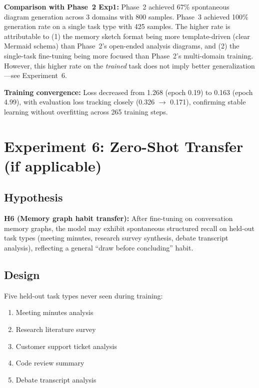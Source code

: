 \documentclass[11pt,a4paper]{article}
\begin{document}
\textbf{Comparison with Phase~2 Exp1:} Phase~2 achieved 67\% spontaneous diagram generation across 3 domains with 800 samples. Phase~3 achieved 100\% generation rate on a single task type with 425 samples. The higher rate is attributable to (1) the memory sketch format being more template-driven (clear Mermaid schema) than Phase~2's open-ended analysis diagrams, and (2) the single-task fine-tuning being more focused than Phase~2's multi-domain training. However, this higher rate on the \textit{trained} task does not imply better generalization---see Experiment~6.

\textbf{Training convergence:} Loss decreased from 1.268 (epoch 0.19) to 0.163 (epoch 4.99), with evaluation loss tracking closely (0.326 $\rightarrow$ 0.171), confirming stable learning without overfitting across 265 training steps.


\section{Experiment 6: Zero-Shot Transfer (if applicable)}

\subsection{Hypothesis}

\textbf{H6 (Memory graph habit transfer):} After fine-tuning on conversation memory graphs, the model may exhibit spontaneous structured recall on held-out task types (meeting minutes, research survey synthesis, debate transcript analysis), reflecting a general ``draw before concluding'' habit.

\subsection{Design}

Five held-out task types never seen during training:
\begin{enumerate}[nosep]
\item Meeting minutes analysis
\item Research literature survey
\item Customer support ticket analysis
\item Code review summary
\item Debate transcript analysis
\end{enumerate}
\end{document}
